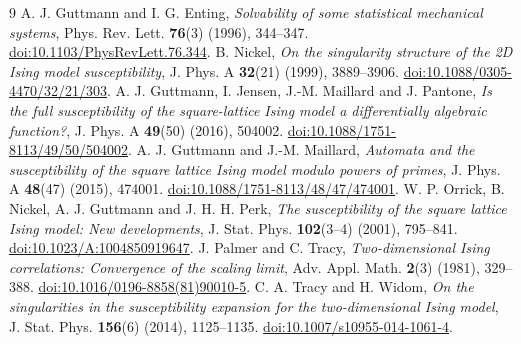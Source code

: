 \documentclass[11pt]{article}
\begin{document}
\begingroup\small
\begin{thebibliography}{9}
\setlength{\itemsep}{3pt}\setlength{\parsep}{0pt}
 A. J. Guttmann and I. G. Enting,
\emph{Solvability of some statistical mechanical systems},
Phys. Rev. Lett. \textbf{76}(3) (1996), 344--347.
\href{https://doi.org/10.1103/PhysRevLett.76.344}{doi:10.1103/PhysRevLett.76.344}.
 B. Nickel, \emph{On the singularity structure of the
2D Ising model susceptibility}, J. Phys. A \textbf{32}(21) (1999),
3889--3906. \href{https://doi.org/10.1088/0305-4470/32/21/303}{doi:10.1088/0305-4470/32/21/303}.
 A. J. Guttmann, I. Jensen, J.-M. Maillard and J. Pantone,
\emph{Is the full susceptibility of the square-lattice Ising model a
differentially algebraic function?}, J. Phys. A \textbf{49}(50) (2016),
504002. \href{https://doi.org/10.1088/1751-8113/49/50/504002}{doi:10.1088/1751-8113/49/50/504002}.
 A. J. Guttmann and J.-M. Maillard,
\emph{Automata and the susceptibility of the square lattice Ising model
modulo powers of primes}, J. Phys. A \textbf{48}(47) (2015), 474001.
\href{https://doi.org/10.1088/1751-8113/48/47/474001}{doi:10.1088/1751-8113/48/47/474001}.
 W. P. Orrick, B. Nickel, A. J. Guttmann and J. H. H. Perk,
\emph{The susceptibility of the square lattice Ising model: New developments},
J. Stat. Phys. \textbf{102}(3--4) (2001), 795--841.
\href{https://doi.org/10.1023/A:1004850919647}{doi:10.1023/A:1004850919647}.
 J. Palmer and C. Tracy, \emph{Two-dimensional Ising
correlations: Convergence of the scaling limit}, Adv. Appl. Math.
\textbf{2}(3) (1981), 329--388.
\href{https://doi.org/10.1016/0196-8858(81)90010-5}{doi:10.1016/0196-8858(81)90010-5}.
 C. A. Tracy and H. Widom, \emph{On the singularities in the
susceptibility expansion for the two-dimensional Ising model},
J. Stat. Phys. \textbf{156}(6) (2014), 1125--1135.
\href{https://doi.org/10.1007/s10955-014-1061-4}{doi:10.1007/s10955-014-1061-4}.
\end{thebibliography}
\endgroup
\end{document}
